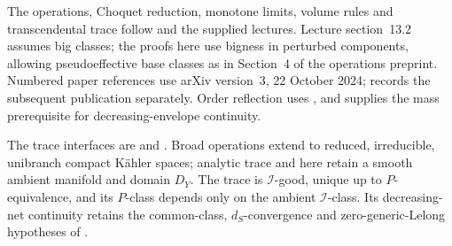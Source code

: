 \begin{remark}
\label{rem:operations-source-note}
The operations, Choquet reduction, monotone limits, volume rules and
transcendental trace follow \cite{XiaOperationsV3} and the supplied lectures.
Lecture section~13.2 assumes big classes; the proofs here use bigness in
perturbed components, allowing pseudoeffective base classes as in
Section~4 of the operations preprint.
Numbered paper references use arXiv version~3, 22 October 2024;
\cite{Xia23Operations} records the subsequent publication separately.
Order reflection uses \cite[Proposition~6.1.3]{XiaBook}, and
 supplies the mass prerequisite
for decreasing-envelope continuity.

The trace interfaces are \cite[Section~3]{DXTraceV2} and
\cite[Sections~8.1--8.2]{XiaBook}.
Broad operations extend to reduced, irreducible, unibranch compact
K\"ahler spaces; analytic trace and
 here retain a smooth ambient
manifold and domain $D_Y$.
The trace is $\mathcal I$-good, unique up to $P$-equivalence, and its
$P$-class depends only on the ambient $\mathcal I$-class.
Its decreasing-net continuity retains the common-class,
$d_S$-convergence and zero-generic-Lelong hypotheses of
.
\end{remark}
